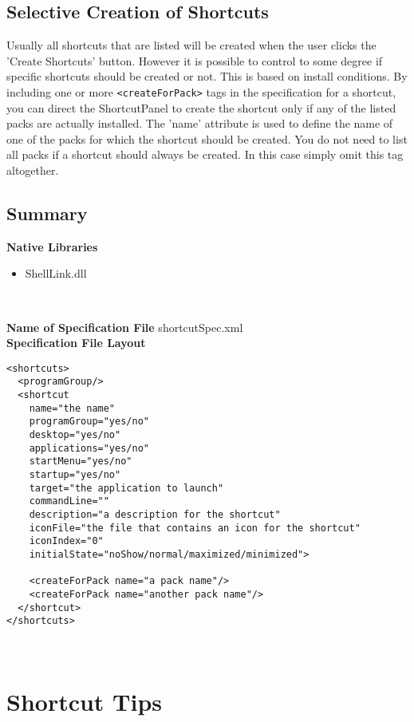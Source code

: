 \subsection{Selective Creation of Shortcuts}

Usually all shortcuts that are listed will be created when the user
clicks the 'Create Shortcuts' button. However it is possible to control
to some degree if specific shortcuts should be created or not. This is
based on install conditions. By including one or more \texttt{<createForPack>}
tags in the specification for a shortcut, you can direct the
ShortcutPanel to create the shortcut only if any of the listed packs are
actually installed. The 'name' attribute is used to define the name of
one of the packs for which the shortcut should be created. You do not
need to list all packs if a shortcut should always be created. In this
case simply omit this tag altogether.\\

\subsection{Summary}

\textbf{Native Libraries}
\begin{itemize}
\item ShellLink.dll
\end{itemize}\

\textbf{Name of Specification File}
shortcutSpec.xml\\

\textbf{Specification File Layout}
\footnotesize
\begin{verbatim}
<shortcuts>
  <programGroup/>
  <shortcut 
    name="the name"
    programGroup="yes/no"
    desktop="yes/no" 
    applications="yes/no" 
    startMenu="yes/no" 
    startup="yes/no"
    target="the application to launch"
    commandLine=""
    description="a description for the shortcut"
    iconFile="the file that contains an icon for the shortcut" 
    iconIndex="0"
    initialState="noShow/normal/maximized/minimized">
  
    <createForPack name="a pack name"/>
    <createForPack name="another pack name"/>
  </shortcut>
</shortcuts>
\end{verbatim}\
\normalsize

\section{Shortcut Tips}

